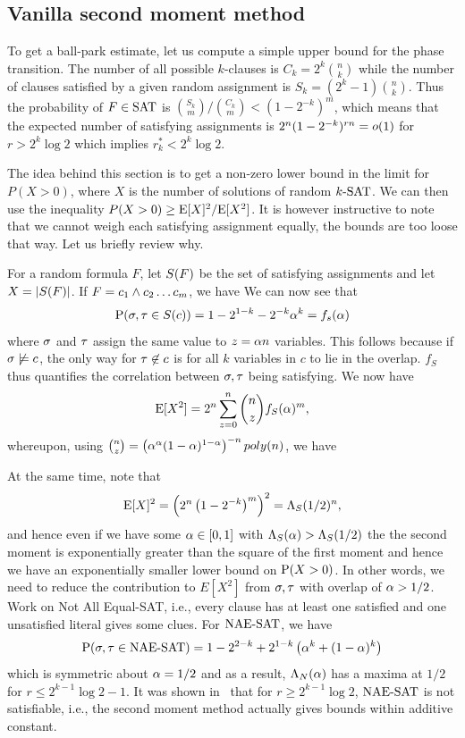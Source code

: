 \documentclass[letterpaper, 10pt, twocolumn, reqno]{amsart}
\begin{document}
\subsection{Vanilla second moment method}
\label{ssec:ksat_vanilla}
To get a ball-park estimate, let us compute a simple upper bound for the phase
transition. The number of all possible $k$-clauses is $C_k = 2^k \binom{n}{k}$
 while the number of clauses satisfied by a given random assignment is $S_k = (2^k -1) \binom{n}{k}$. Thus the probability of $F \in \SAT$ is $\binom{S_k}{m}/\binom{C_k}{m} < (1-2^{-k})^m$, which means that the expected number of
satisfying assignments is $2^n (1-2^{-k})^{rn} = \smallo(1)$ for $r > 2^k \log 2$ which implies $r_k^* < 2^k \log 2$.

The idea behind this section is to get a non-zero lower bound in the limit for $P(X > 0)$, where $X$ is the number of solutions of random $\ksat$. We can then use the inequality $P(X>0) \geq \E[X]^2/\E[X^2]$. It is however instructive to note that we cannot weigh each satisfying assignment equally, the bounds are too loose that way. Let us briefly review why.

For a random formula $F$, let $\sf$ be the set of satisfying assignments and let $X = \abs{\sf}$. If $F = c_1 \aand c_2 \ldots c_m$, we have
We can now see that
$$
\P(\s,\t \in \sc) = 1 -2^{1-k} - 2^{-k}\a^k = f_s(\a)
$$
where $\s$ and $\t$ assign the same value to $z = \a n$ variables. This follows because if $\s \not\sat c$, the only way for $\t \not\in c$ is for all $k$ variables in $c$ to lie in the overlap. $f_S$ thus quantifies the correlation between $\s,\t$ being satisfying. We now have
$$
\E[X^2] = 2^n \sum_{z=0}^n \binom{n}{z} f_S(\a)^m,
$$
whereupon, using $\binom{n}{z} = \rbrac{\a^\a (1-\a)^{1-\a}}^{-n} poly(n)$, we have

At the same time, note that
$$
\E[X]^2 = \rbrac{2^n \rbrac{1 - 2^{-k}}^m }^2 = \L_S(1/2)^n,
$$
and hence even if we have some $\a \in [0,1]$ with $\L_S(\a) > \L_S(1/2)$ the
the second moment is exponentially greater than the square of the first moment and hence we have an exponentially smaller lower bound on $\P(X > 0)$. In
other words, we need to reduce the contribution to $E[X^2]$ from $\s,\t$ with overlap of $\a > 1/2$. Work on Not All Equal-SAT, i.e., every clause has at
least one satisfied and one unsatisfied literal gives some clues. For $\NAESAT$, we have
$$
\P(\s,\t \in \NAESAT) = 1 - 2^{2-k} + 2^{1-k} \rbrac{\a^k + (1-\a)^k}
$$
which is symmetric about $\a = 1/2$ and as a result, $\L_N(\a)$ has a maxima at $1/2$ for $r \leq 2^{k-1} \log2 -1$. It was shown in~\cite{achlioptas2002asymptotic} that for $r \geq 2^{k-1} \log2$, $\NAESAT$ is not satisfiable, i.e., the second moment method actually gives bounds within additive constant.
\end{document}
